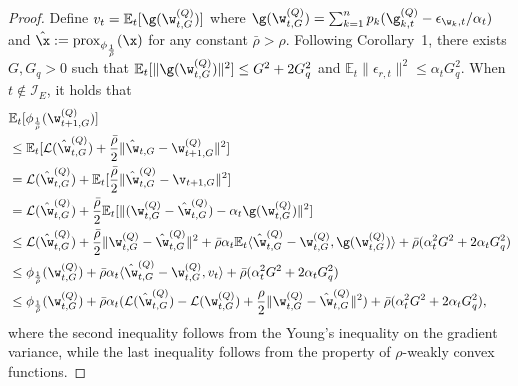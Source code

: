 \documentclass[a4paper,11pt]{article}
\begin{document}
\begin{proof}
Define $v_t = \mathbb{E}_t[\g(\w^{(Q)}_{t, G})]$ where $\g(\w^{(Q)}_{t, G}) = \sum_{k=1}^n p_k (\g^{(Q)}_{k, t} - \epsilon_{\w_k, t}/\alpha_t )$ and $\hat{\x} := \mathrm{prox}_{\phi_{\frac{1}{\bar{\rho}}}}(\x)$ for any constant $\bar{\rho} > \rho$. 
Following Corollary~1, there exists $G, G_q >0 $ such that
$\mathbb{E}_t [\| \g(\w^{(Q)}_{t, G})\|^2] \leq G^2 + 2G_q^2$ and $\mathbb{E}_t\|\epsilon_{r, t} \|^2 \leq \alpha_t G_q^2$.
When $t \notin \mathcal{I}_E$, it holds that
\begin{align*}
    & \mathbb{E}_t [\phi_{\frac{1}{\bar{\rho}}}(\w^{(Q)}_{t+1, G})]\\
    & \leq \mathbb{E}_t [\mathcal{L}(\hat{\w}^{(Q)}_{t, G}) + \frac{\bar{\rho}}{2}\|\hat{\w }_{t, G} - \w^{(Q)}_{t+1, G} \|^2  ] \\
    & = \mathcal{L}(\hat{\w }^{(Q)}_{t, G}) + \mathbb{E}_t[ \frac{\bar{\rho}}{2}\|\hat{\w}^{(Q)}_{t, G} - \v_{t+1, G} \|^2 ] \\
    & = \mathcal{L}(\hat{\w }^{(Q)}_{t, G}) + \frac{\bar{\rho}}{2}\mathbb{E}_t [\| (\w^{(Q)}_{t, G} - \hat{\w }^{(Q)}_{t, G}) -  \alpha_{t} \g(\w^{(Q)}_{t, G}) \|^2 ] \\
    & \leq \mathcal{L}(\hat{\w}^{(Q)}_{t, G}) + \frac{\bar{\rho}}{2} \| \w^{(Q)}_{t, G} - \hat{\w }^{(Q)}_{t, G}\|^2 + \bar{\rho} \alpha_t \mathbb{E}_t\langle \hat{\w }^{(Q)}_{t, G} - \w^{(Q)}_{t, G}, \g(\w^{(Q)}_{t, G}) \rangle + \bar{\rho}(\alpha_t^2G^2+2\alpha_t G_q^2) \\
    & \leq \phi_{\frac{1}{\bar{\rho}}}(\w^{(Q)}_{t, G}) + \bar{\rho} \alpha_t \langle \hat{\w}^{(Q)}_{t, G} - \w^{(Q)}_{t, G}, v_t \rangle + \bar{\rho}(\alpha_t^2G^2+2\alpha_t G_q^2) \\
    & \leq  \phi_{\frac{1}{\bar{\rho}}}(\w^{(Q)}_{t, G}) + \bar{\rho}\alpha_t (\mathcal{L}(\hat{\w}^{(Q)}_{t, G} ) - \mathcal{L}(\w^{(Q)}_{t, G}) + \frac{\rho}{2} \|\w^{(Q)}_{t, G} - \hat{\w }^{(Q)}_{t, G} \|^2 ) + \bar{\rho}(\alpha_t^2G^2+2\alpha_t G_q^2),
\end{align*}
where the second inequality follows from the Young's inequality on the gradient variance, while the last inequality follows from the property of $\rho$-weakly convex functions. 


\end{proof}
\end{document}
